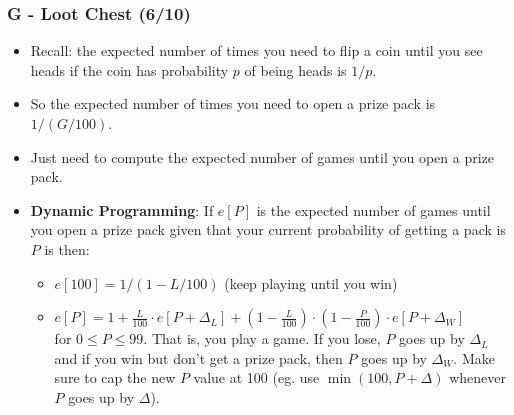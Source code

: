 \documentclass{beamer}
\begin{document}
\begin{frame}
\frametitle{G - Loot Chest (6/10)}
\begin{itemize}
\setlength\itemsep{0.5\baselineskip}
\item Recall: the expected number of times you need to flip a coin until you see heads if the coin has probability $p$ of being heads is $1/p$.
\item So the expected number of times you need to open a prize pack is $1/(G/100)$.
\item Just need to compute the expected number of games until you open a prize pack.
\item {\bf Dynamic Programming}: If $e[P]$ is the expected number of games until you open a prize pack given that your current probability of getting a pack is $P$ is then:
\begin{itemize}
\item $e[100] = 1/(1-L/100)$ (keep playing until you win)
\item $e[P] = 1 + \frac{L}{100} \cdot e[P+\Delta_L] + \left(1-\frac{L}{100}\right) \cdot \left(1 - \frac{P}{100}\right) \cdot e[P+\Delta_W]$\\
for $0 \leq P \leq 99$. That is, you play a game. If you lose, $P$ goes up by $\Delta_L$ and if you win but don't get a prize pack, then $P$ goes up by $\Delta_W$.
Make sure to cap the new $P$ value at 100 (eg. use $\min(100, P+\Delta)$ whenever $P$ goes up by $\Delta$).
\end{itemize}
\end{itemize}
\end{frame}




\end{document}

